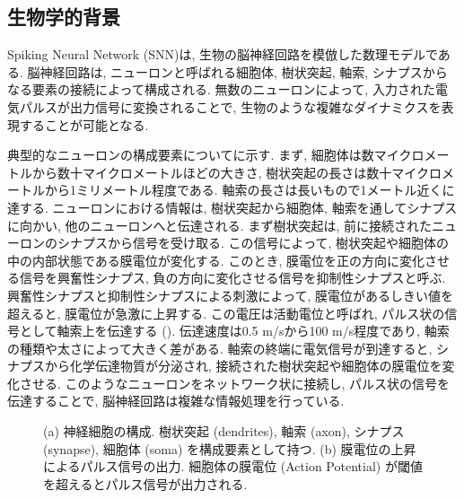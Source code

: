 \subsection{生物学的背景}
Spiking Neural Network (SNN)は, 生物の脳神経回路を模倣した数理モデルである.
脳神経回路は, ニューロンと呼ばれる細胞体, 樹状突起, 軸索, シナプスからなる要素の接続によって構成される\cite{braincomputing}.
無数のニューロンによって, 入力された電気パルスが出力信号に変換されることで, 生物のような複雑なダイナミクスを表現することが可能となる.

典型的なニューロンの構成要素についてに示す.
まず, 細胞体は数マイクロメートルから数十マイクロメートルほどの大きさ, 樹状突起の長さは数十マイクロメートルから1ミリメートル程度である.
軸索の長さは長いもので1メートル近くに達する.
ニューロンにおける情報は, 樹状突起から細胞体, 軸索を通してシナプスに向かい, 他のニューロンへと伝達される.
まず樹状突起は, 前に接続されたニューロンのシナプスから信号を受け取る.
この信号によって, 樹状突起や細胞体の中の内部状態である膜電位が変化する.
このとき, 膜電位を正の方向に変化させる信号を興奮性シナプス, 負の方向に変化させる信号を抑制性シナプスと呼ぶ.
興奮性シナプスと抑制性シナプスによる刺激によって, 膜電位があるしきい値を超えると, 膜電位が急激に上昇する.
この電圧は活動電位と呼ばれ, パルス状の信号として軸索上を伝達する ().
伝達速度は0.5 m/sから100 m/s程度であり, 軸索の種類や太さによって大きく差がある.
軸索の終端に電気信号が到達すると, シナプスから化学伝達物質が分泌され, 接続された樹状突起や細胞体の膜電位を変化させる.
このようなニューロンをネットワーク状に接続し, パルス状の信号を伝達することで, 脳神経回路は複雑な情報処理を行っている.

\begin{figure}[htb]
    \centering

    \begin{minipage}{0.497\textwidth}
        \centering
        
        \label{fig:brain:neuron}
    \end{minipage}
    \hspace{0.02\textwidth}
    \begin{minipage}{0.3474\textwidth}
        \centering
        
        \label{fig:brain:actionpotential}
    \end{minipage}

    \caption[脳神経回路の模式図]{
        \cite{lobo2020spiking}
        (a) 神経細胞の構成. 
        樹状突起 (dendrites), 軸索 (axon), シナプス (synapse), 細胞体 (soma) を構成要素として持つ.
        (b) 膜電位の上昇によるパルス信号の出力.
        細胞体の膜電位 (Action Potential) が閾値を超えるとパルス信号が出力される.
    }
\end{figure}
